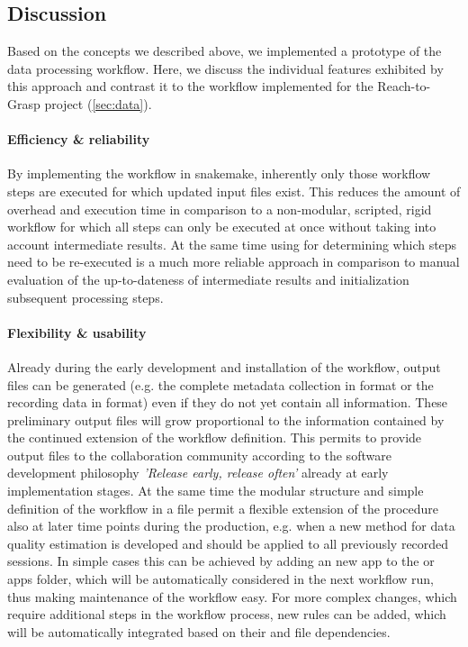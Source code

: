 \subsection{Discussion}
Based on the concepts we described above, we implemented a prototype of the data processing workflow. Here, we discuss the individual features exhibited by this approach and contrast it to the workflow implemented for the Reach-to-Grasp project (\cref{sec:data}).

\label{sec:workflow_discussion}
\paragraph{Efficiency \& reliability}
By implementing the workflow in snakemake, inherently only those workflow steps are executed for which updated input files exist. This reduces the amount of overhead and execution time in comparison to a non-modular, scripted, rigid workflow for which all steps can only be executed at once without taking into account intermediate results.
At the same time using  for determining which steps need to be re-executed is a much more reliable approach in comparison to manual evaluation of the up-to-dateness of intermediate results and initialization subsequent processing steps.

\paragraph{Flexibility \& usability}
Already during the early development and installation of the workflow, output files can be generated (e.g. the complete metadata collection in  format or the recording data in  format) even if they do not yet contain all information. These preliminary output files will grow proportional to the information contained by the continued extension of the workflow definition. This permits to provide output files to the collaboration community according to the software development philosophy \textit{'Release early, release often'} \citep{Martin_2008} already at early implementation stages. At the same time the modular structure and simple definition of the workflow in a  file permit a flexible extension of the procedure also at later time points during the production, e.g. when a new method for data quality estimation is developed and should be applied to all previously recorded sessions. In simple cases this can be achieved by adding an new app to the  or  apps folder, which will be automatically considered in the next workflow run, thus making maintenance of the workflow easy. For more complex changes, which require additional steps in the workflow process, new rules can be added, which will be automatically integrated based on their  and  file dependencies.

